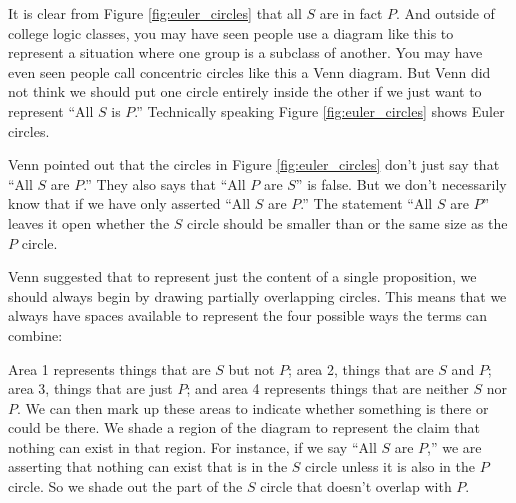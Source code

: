 It is clear from Figure \ref{fig:euler_circles} that all $S$ are in fact $P$. And outside of college logic classes, you may have seen people use a diagram like this to represent a situation where one group is a subclass of another. You may have even seen people call concentric circles like this a Venn diagram. But Venn did not think we should put one circle entirely inside the other if we just want to represent ``All $S$ is $P$.'' Technically speaking Figure \ref{fig:euler_circles} shows Euler circles.

Venn pointed out that the circles in Figure \ref{fig:euler_circles} don't just say that ``All $S$ are $P$.'' They also says that ``All $P$ are $S$'' is false. But we don't necessarily know that if we have only asserted ``All $S$ are $P$.'' The statement ``All $S$ are $P$'' leaves it open whether the $S$ circle should be smaller than or the same size as the $P$ circle.

Venn suggested that to represent just the content of a single proposition, we should always begin by drawing partially overlapping circles. This means that we always have spaces available to represent the four possible ways the terms can combine: 

\begin{center}
\label{fig:two_circle_venn}
\end{center}

Area 1 represents things that are $S$ but not $P$; area 2, things that are $S$ and $P$; area 3, things that are just $P$; and area 4 represents things that are neither $S$ nor $P$. We can then mark up these areas to indicate whether something is there or could be there. We shade a region of the diagram to represent the claim that nothing can exist in that region. For instance, if we say ``All $S$ are $P$,'' we are asserting that nothing can exist that is in the $S$ circle unless it is also in the $P$ circle. So we shade out the part of the $S$ circle that doesn't overlap with $P$. 

\begin{center}
\end{center}


